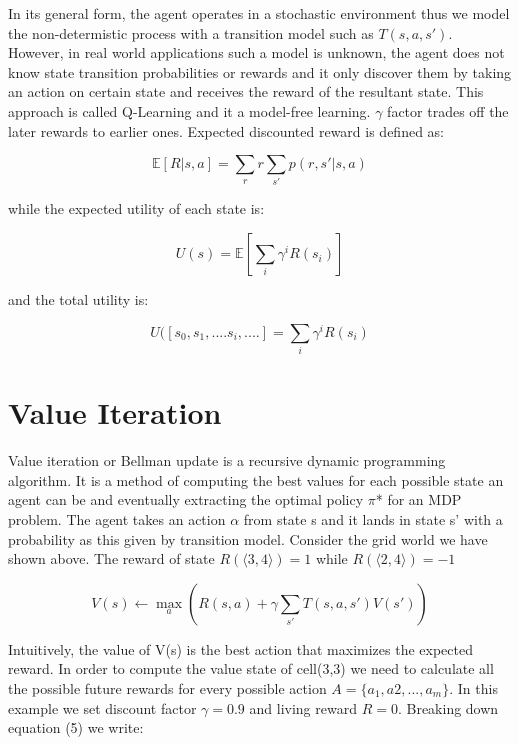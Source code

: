 \documentclass[10pt,a4paper,twocolumn]{article}
\begin{document}
	In its general form, the agent operates in a stochastic environment thus we model the non-determistic process with a transition model such as $T(s,a,s')$. However, in real world applications such a model is unknown, the agent does not know state transition probabilities or rewards and it only discover them by taking an action on certain state and receives the reward of the resultant state. This approach is called Q-Learning and it a model-free learning.
	$\gamma$ factor trades off the later rewards to earlier ones. Expected discounted reward is defined as:
	
	\begin{equation}
		\mathbb{E}[R | s,a] = \sum_{r}r \sum_{s'}p(r, s' | s, a)
	\end{equation}
	
	while the expected utility of each state is:
	
	\begin{equation}
		U(s) = \mathbb{E}[ \sum_{i}\gamma^{i}R(s_{i})]
	\end{equation}
	
	
	and the total utility is:
	
	\begin{equation}
		U([s_{0}, s_{1}, .... s_{i}, ....] = \sum_{i}\gamma^{i}R(s_{i})
	\end{equation}
	
	\section{Value Iteration}
	Value iteration or Bellman update is a recursive dynamic programming algorithm. It is a method of computing the best values for each possible state an agent can be and eventually extracting the optimal policy $\pi$* for an MDP problem. The agent takes an action $\alpha$ from state s and it lands in state s’ with a probability as this given by transition model. Consider the grid world we have shown above. The reward of state $R(\big \langle 3,4 \big \rangle) = 1$ while $R(\big \langle 2,4 \big \rangle) = -1$
	
	\begin{equation}
		V(s) \leftarrow \max_{a} { ( R(s,a) + \gamma \sum_{s'}T(s,a,s')V(s') )}
	\end{equation}
	
	Intuitively, the value of V(s) is the best action that maximizes the expected reward. In order to compute the value state of cell(3,3) we need to calculate all the possible future rewards for every possible action $A = \{ a_{1}, a{2}, ..., a_{m} \}$. In this example we set discount factor $\gamma = 0.9$ and living reward $R=0$. Breaking down equation (5) we write:
	
\end{document}
